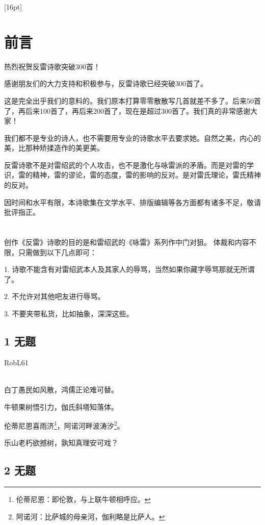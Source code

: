 {[}16pt{]}

\hypertarget{ux524dux8a00}{%
\section{前言}\label{ux524dux8a00}}

热烈祝贺反雷诗歌突破300首！

感谢朋友们的大力支持和积极参与，反雷诗歌已经突破300首了。

这是完全出乎我们的意料的。我们原本打算零零散散写几首就差不多了。后来50首了，再后来100首了，再后来200首了，现在是超过300首了。我们真的非常感谢大家！

我们都不是专业的诗人，也不需要用专业的诗歌水平去要求她。自然之美，内心的美，比那种矫揉造作的美更美。

反雷诗歌不是对雷绍武的个人攻击，也不是激化与咏雷派的矛盾。而是对雷的学识，雷的精神，雷的谬论，雷的态度，雷的影响的反对。是对雷氏理论，雷氏精神的反对。

因时间和水平有限，本诗歌集在文学水平、排版编辑等各方面都有诸多不足，敬请批评指正。

\hypertarget{section}{%
\section{}\label{section}}

创作《反雷》诗歌的目的是和雷绍武的《咏雷》系列作中门对狙。
体裁和内容不限，只需做到以下几点即可：

1.
诗歌不能含有对雷绍武本人及其家人的辱骂，当然如果你藏字辱骂那就无所谓了。

2. 不允许对其他吧友进行辱骂。

3. 不要夹带私货，比如抽象，深深这些。

\hypertarget{ux65e0ux9898}{%
\subsection{1 无题}\label{ux65e0ux9898}}

RobL61

~\\
白丁愚民如风散，鸿儒正论难可替。

牛顿果树悟引力，伽氏斜塔知落体。

伦蒂尼恩喜雨济\footnote{伦蒂尼恩：即伦敦，与上联牛顿相呼应。}，阿诺河畔波涛汐\footnote{阿诺河：比萨城的母亲河，伽利略是比萨人。}。

乐山老朽欲撼树，孰知真理安可戏？

\hypertarget{ux65e0ux9898-1}{%
\subsection{2 无题}\label{ux65e0ux9898-1}}

